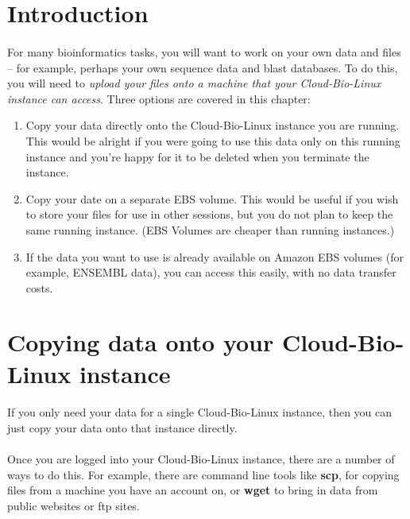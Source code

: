 \section{Introduction}\label{section:data}

\paragraph{}For many bioinformatics tasks, you will want to work on your own data and files – for example, perhaps your own sequence data and blast databases. To do this, you will need to \emph{upload your files onto a machine that your Cloud-Bio-Linux instance can access}. Three options are covered in this chapter:
\begin{enumerate}
\item Copy your data directly onto the Cloud-Bio-Linux instance you are running. This would be alright if you were going to use this data only on this running instance and you're happy for it to be deleted when you terminate the instance.
\item Copy your date on a separate EBS volume. This would be useful if you wish to store your files for use in other sessions, but you do not plan to keep the same running instance. (EBS Volumes are cheaper than running instances.) 
\item If the data you want to use is already available on Amazon EBS volumes (for example, ENSEMBL data), you can access this easily, with no data transfer costs. 
\end{enumerate}

\section{Copying data onto your Cloud-Bio-Linux instance}

\paragraph{}If you only need your data for a single Cloud-Bio-Linux instance, then you can just copy your data onto that instance directly.
 
\paragraph{}Once you are logged into your Cloud-Bio-Linux instance, there are a number of ways to do this. For example, there are command line tools like \textbf{scp}, for copying files from a machine you have an account on, or \textbf{wget} to bring in data from public websites or ftp sites. 
